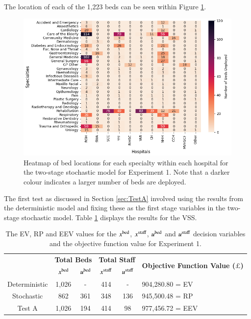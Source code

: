\documentclass[../thesis.tex]{subfiles}
\begin{document}
The location of each of the 1,223 beds can be seen within Figure \ref{fig:stocHeatmap1}.
\begin{figure}[h!]
    \centering
    \includegraphics[scale=1]{Chapters/Chapter5/Figuresnew/Stoc.png}
    \caption{Heatmap of bed locations for each specialty within each hospital for the two-stage stochastic model for Experiment 1. Note that a darker colour indicates a larger number of beds are deployed.}
    \label{fig:stocHeatmap1}
\end{figure}

The first test as discussed in Section \ref{sec:TestA} involved using the results from the deterministic model and fixing these as the first stage variables in the two-stage stochastic model. Table \ref{tab:eevdettwostageresults1} displays the results for the VSS. 


\begin{table}[h!]
    \centering
    \begin{tabular}{cccccl}\toprule
 & \multicolumn{2}{l}{\textbf{Total Beds}} & \multicolumn{2}{c}{\textbf{Total Staff}} & \multirow{2}{*}{\textbf{Objective Function Value ($\pounds$)}}\\ \cmidrule(lr){2-3} \cmidrule(lr){4-5}
 & $x^\textnormal{bed}$           & $u^\textnormal{bed}$          & $x^\textnormal{staff}$         & $u^\textnormal{staff}$         \\ \midrule
       Deterministic & 1,026 & - &  414 & - & 904,280.80 =  EV \\ \midrule
      Stochastic & 862 & 361  & 348 & 136 & 945,500.48 = RP\\ \midrule
      Test A & 1,026 & 194 & 414&  98 &  977,456.72 = EEV \\\bottomrule
    \end{tabular}
    \caption{The EV, RP and EEV values for the $x^\textnormal{bed}$, $x^\textnormal{staff}$, $u^\textnormal{bed}$ and $u^\textnormal{staff}$ decision variables and the objective function value for Experiment 1.}
    \label{tab:eevdettwostageresults1}
\end{table}
\end{document}

